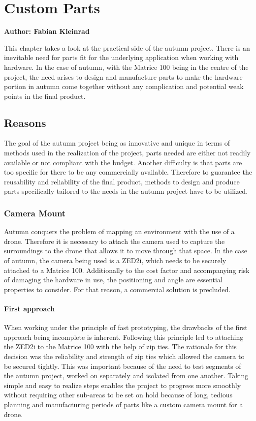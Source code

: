 \chapter{Custom Parts}

\textbf{Author: Fabian Kleinrad} 

This chapter takes a look at the practical side of the autumn project. There is an inevitable need for parts fit for the underlying application when working with hardware. In the case of autumn, with the Matrice 100 being in the centre of the project, the need arises to design and manufacture parts to make the hardware portion in autumn come together without any complication and potential weak points in the final product.

\section{Reasons}

The goal of the autumn project being as innovative and unique in terms of methods used in the realization of the project, parts needed are either not readily available or not compliant with the budget. Another difficulty is that parts are too specific for there to be any commercially available. Therefore to guarantee the reusability and reliability of the final product, methods to design and produce parts specifically tailored to the needs in the autumn project have to be utilized.

\subsection{Camera Mount}

Autumn conquers the problem of mapping an environment with the use of a drone. Therefore it is necessary to attach the camera used to capture the surroundings to the drone that allows it to move through that space. In the case of autumn, the camera being used is a ZED2i, which needs to be securely attached to a Matrice 100. Additionally to the cost factor and accompanying risk of damaging the hardware in use, the positioning and angle are essential properties to consider. For that reason, a commercial solution is precluded.

\subsubsection{First approach}

When working under the principle of fast prototyping, the drawbacks of the first approach being incomplete is inherent. Following this principle led to attaching the ZED2i to the Matrice 100 with the help of zip ties. The rationale for this decision was the reliability and strength of zip ties which allowed the camera to be secured tightly. This was important because of the need to test segments of the autumn project, worked on separately and isolated from one another. Taking simple and easy to realize steps enables the project to progress more smoothly without requiring other sub-areas to be set on hold because of long, tedious planning and manufacturing periods of parts like a custom camera mount for a drone.

